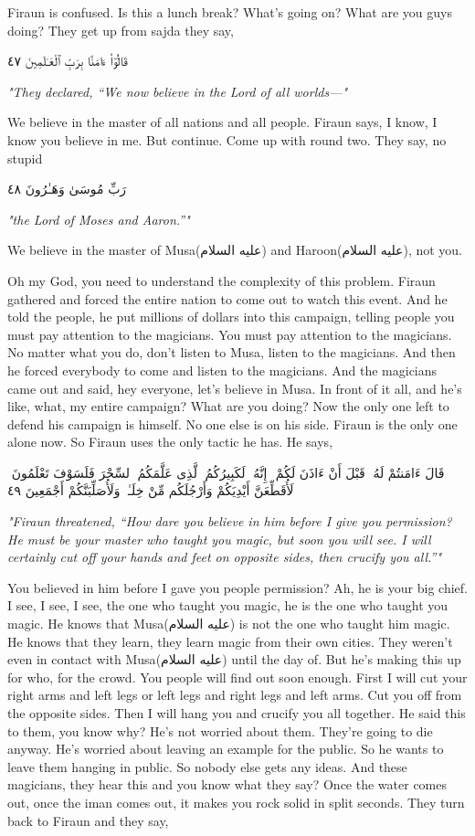 \documentclass[12pt]{article}
\newcommand{\as}{\textarabic{(عليه السلام)}}
\begin{document}
Firaun is confused. Is this a lunch break? What's going on? What are you guys doing? They get up from sajda they say, 

\textarabic{قَالُوٓا۟ ءَامَنَّا بِرَبِّ ٱلْعَـٰلَمِينَ ٤٧}

\textit{"They declared, “We now believe in the Lord of all worlds—"}

We believe in the master of all nations and all people. Firaun says, I know, I know you believe in me. But continue. Come up with round two. They say, no stupid 

\textarabic{رَبِّ مُوسَىٰ وَهَـٰرُونَ ٤٨}

\textit{"the Lord of Moses and Aaron.”"}

We believe in the master of Musa\as{} and Haroon\as{}, not you. 

Oh my God, you need to understand the complexity of this problem. Firaun gathered and forced the entire nation to come out to watch this event. And he told the people, he put millions of dollars into this campaign, telling people you must pay attention to the magicians. You must pay attention to the magicians. No matter what you do, don't listen to Musa, listen to the magicians. And then he forced everybody to come and listen to the magicians. And the magicians came out and said, hey everyone, let's believe in Musa. In front of it all, and he's like, what, my entire campaign? What are you doing? Now the only one left to defend his campaign is himself. No one else is on his side. Firaun is the only one alone now. So Firaun uses the only tactic he has. He says, 

\textarabic{قَالَ ءَامَنتُمْ لَهُۥ قَبْلَ أَنْ ءَاذَنَ لَكُمْ ۖ إِنَّهُۥ لَكَبِيرُكُمُ ٱلَّذِى عَلَّمَكُمُ ٱلسِّحْرَ فَلَسَوْفَ تَعْلَمُونَ ۚ لَأُقَطِّعَنَّ أَيْدِيَكُمْ وَأَرْجُلَكُم مِّنْ خِلَـٰفٍۢ وَلَأُصَلِّبَنَّكُمْ أَجْمَعِينَ ٤٩}

\textit{"Firaun threatened, “How dare you believe in him before I give you permission? He must be your master who taught you magic, but soon you will see. I will certainly cut off your hands and feet on opposite sides, then crucify you all.”"}

You believed in him before I gave you people permission? Ah, he is your big chief. I see, I see, I see, the one who taught you magic, he is the one who taught you magic. He knows that Musa\as{} is not the one who taught him magic. He knows that they learn, they learn magic from their own cities. They weren't even in contact with Musa\as{} until the day of. But he's making this up for who, for the crowd. You people will find out soon enough. First I will cut your right arms and left legs or left legs and right legs and left arms. Cut you off from the opposite sides. Then I will hang you and crucify you all together. He said this to them, you know why? He's not worried about them. They're going to die anyway. He's worried about leaving an example for the public. So he wants to leave them hanging in public. So nobody else gets any ideas. And these magicians, they hear this and you know what they say? Once the water comes out, once the iman comes out, it makes you rock solid in split seconds. They turn back to Firaun and they say, 
\end{document}
